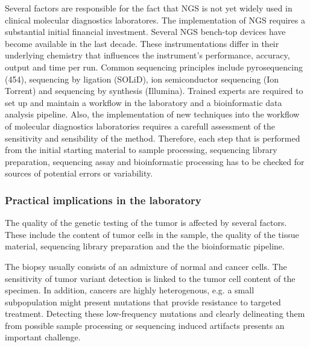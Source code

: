 {{    Several factors are responsible for the fact that NGS is not yet widely
    used in clinical molecular diagnostics laboratores. The implementation
    of NGS requires a substantial initial financial investment. Several NGS
    bench-top devices have become available in the last decade. These
    instrumentations differ in their underlying chemistry that influences the
    instrument’s performance, accuracy, output and time per run. Common
    sequencing principles include pyrosequencing (454), sequencing by ligation
    (SOLiD), ion semiconductor sequencing (Ion Torrent) and sequencing by
    synthesis (Illumina). Trained experts are required to set up and maintain
    a workflow in the laboratory and a bioinformatic data analysis pipeline.
    Also, the implementation of new techniques into the workflow of molecular
    diagnostics laboratories requires a carefull assessment of the sensitivity
    and sensibility of the method. Therefore, each step that is performed from
    the initial starting material to sample processing, sequencing library
    preparation, sequencing assay and bioinformatic processing has to be
    checked for sources of potential errors or variability.

    \subsubsection{Practical implications in the laboratory}

      The quality of the genetic testing of the tumor is affected by several
      factors. These include the content of tumor cells in the sample, the
      quality of the tissue material, sequencing library preparation and the the
      bioinformatic pipeline.

      The biopsy usually consists of an admixture of normal and cancer cells.
      The sensitivity of tumor variant detection is linked to the tumor cell
      content of the specimen. In addition, cancers are highly heterogenous,
      e.g. a small subpopulation might present mutations that provide resistance
      to targeted treatment. Detecting these low-frequency mutations and clearly
      delineating them from possible sample processing or sequencing induced
      artifacts presents an important challenge.

}}
